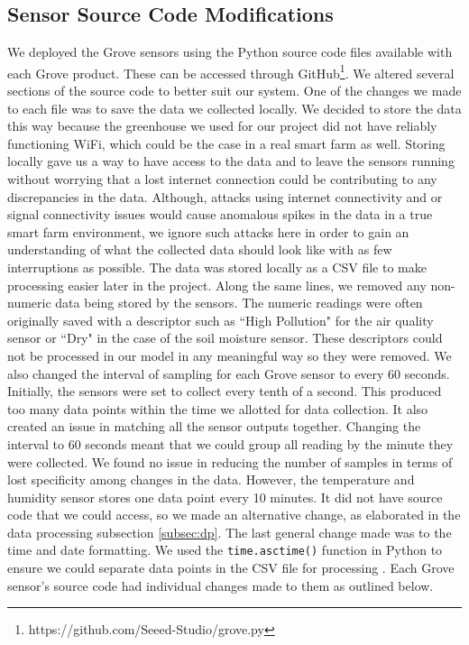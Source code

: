 \subsection{Sensor Source Code Modifications}
\label{Subsec:soft}
We deployed the Grove sensors using the Python source code files available with each Grove product. These can be accessed through  GitHub\footnote{https://github.com/Seeed-Studio/grove.py}. We altered several sections of the source code to better suit our system. One of the changes we made to each file was to save the data we collected locally. We decided to store the data this way because the greenhouse we used for our project did not have reliably functioning WiFi, which could be the case in a real smart farm as well. Storing locally gave us a way to have access to the data and to leave the sensors running without worrying that a lost internet connection could be contributing to any discrepancies in the data. Although, attacks using internet connectivity \cite{sontowski2020cyber} and or signal connectivity issues would cause anomalous spikes in the data in a true smart farm environment, we ignore such attacks here in order to gain an understanding of what the collected data should look like with as few interruptions as possible. The data was stored locally as a CSV file to make processing easier later in the project. Along the same lines, we removed any non-numeric data being stored by the sensors. The numeric readings were often originally saved with a descriptor such as ``High Pollution" for the air quality sensor or ``Dry" in the case of the soil moisture sensor. These descriptors could not be processed in our model in any meaningful way so they were removed. We also changed the interval of sampling for each Grove sensor to every 60 seconds. Initially, the sensors were set to collect every tenth of a second. This produced too many data points within the time we allotted for data collection. It also created an issue in matching all the sensor outputs together. Changing the interval to 60 seconds meant that we could group all reading by the minute they were collected. We found no issue in reducing the number of samples in terms of lost specificity among changes in the data. However, the temperature and humidity sensor stores one data point every 10 minutes. It did not have source code that we could access, so we made an alternative change, as elaborated in the data processing subsection \ref{subsec:dp}. The last general change made was to the time and date formatting. We used the \texttt{time.asctime()} function in Python to ensure we could separate data points in the CSV file for processing \cite{pythontime}. Each Grove sensor's source code had individual changes made to them as outlined below. %

